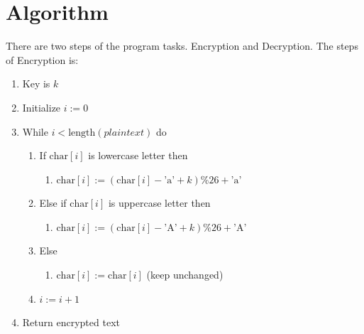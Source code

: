 \section{Algorithm}
There are two steps of the program tasks. Encryption and Decryption. The steps of Encryption is:
\begin{enumerate}
  \item Key is $k$
  \item Initialize $i := 0$
  \item While $i < \text{length}(plaintext)$ do
  \begin{enumerate}
    \item If $\text{char}[i]$ is lowercase letter then
    \begin{enumerate}
      \item $\text{char}[i] := (\text{char}[i] - \text{'a'} + k) \% 26 + \text{'a'}$
    \end{enumerate}
    \item Else if $\text{char}[i]$ is uppercase letter then
    \begin{enumerate}
      \item $\text{char}[i] := (\text{char}[i] - \text{'A'} + k) \% 26 + \text{'A'}$
    \end{enumerate}
    \item Else
    \begin{enumerate}
      \item $\text{char}[i] := \text{char}[i]$ (keep unchanged)
    \end{enumerate}
    \item $i := i + 1$
  \end{enumerate}
  \item Return encrypted text
\end{enumerate}

